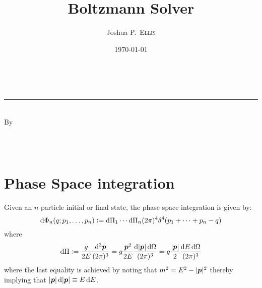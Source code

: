 \documentclass[
  a4paper,             %
  11pt,                %
  oneside,             %
  onecolumn,           %
  bibliography=totoc,  %
  final,               %
]{scrartcl}
\title{Boltzmann Solver}
\author{Joshua P.~\textsc{Ellis}}
\date{\today}
\makeatletter
\newcommand\@degreetitle{}
\newcommand\@department{}
\newcommand\@university{}
\makeatother
\begin{document}

\pagestyle{empty}

\begin{titlepage}
  \makeatletter
  \begin{center}
    \vspace*{2.5cm}

    {\Huge \@title} \\[0em]
    \rule{\linewidth}{2pt}
    {\huge \textsc{\@subtitle}} \\[6em]

    {\large By} \\[1cm]
    {\huge \@author} \\[0.5ex]
    {\Large \normalfont\@degreetitle}

    \vfill

    {\Large \@department} \\[1ex]
    {\Large \@university}

    \vfill

    {\large \@date}
  \end{center}

\makeatother
\end{titlepage}

\cleardoublepage%
\pagestyle{plain}

\tableofcontents

\cleardoublepage%

\section{Phase Space integration}%
\label{sec:phase_space_integration}

Given an \(n\) particle initial or final state, the phase space integration is
given by:
\begin{equation}
  \mathop{}\!\mathrm{d} \Phi_n(q; p_1, \dots, p_n)
  \vcentcolon= \mathop{}\!\mathrm{d} \Pi_1 \cdots \mathop{}\!\mathrm{d} \Pi_n (2 \pi)^4
  \delta^4(p_1 + \cdots + p_n - q)
\end{equation}
where
\begin{equation}
  \dd \Pi
  \defeq \frac{g}{2 E} \ddbar^3{\vt p}
  = g \frac{\vt p^2}{2 E} \frac{\dd \abs{\vt p} \dd \Omega}{(2\pi)^3}
  = g \frac{\abs{\vt p}}{2} \frac{\dd E \dd \Omega}{(2 \pi)^3}
\end{equation}
where the last equality is achieved by noting that \(m^2 = E^2 - \lvert\boldsymbol{p}\rvert^2\)
thereby implying that \(\lvert\boldsymbol{p}\rvert \mathop{}\!\mathrm{d} \lvert\boldsymbol{p}\rvert \equiv E \mathop{}\!\mathrm{d} E\).
\end{document}
